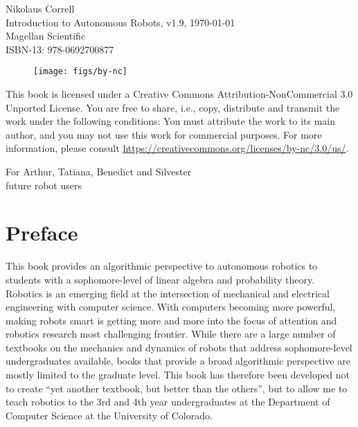 \documentclass[paper=6.14in:9.21in,pagesize=pdftex,11pt,twoside,openright]{scrbook}
\begin{document}

\thispagestyle{empty}
\begin{flushleft}
Nikolaus Correll\\
Introduction to Autonomous Robots, v1.9, \today\\
Magellan Scientific\\
ISBN-13: 978-0692700877
\end{flushleft}

\vfill

\begin{figure}[!h]
\texttt{[image: figs/by-nc]}
\end{figure}

This book is licensed under a Creative Commons Attribution-NonCommercial 3.0 Unported License. You are free to share, i.e., copy, distribute and transmit the work under the following conditions: You must attribute the work to its main author, and you may not use this work for commercial purposes. For more information, please consult \url{https://creativecommons.org/licenses/by-nc/3.0/us/}.


\cleardoublepage
\thispagestyle{empty}
\vspace*{\fill}
\begin{center}
For Arthur, Tatiana, Benedict and Silvester\\
future robot users
\end{center}
\vspace*{\fill}

\tableofcontents

\chapter*{Preface}
This book provides an algorithmic perspective to autonomous robotics to students with a sophomore-level of linear algebra and probability theory. Robotics is an emerging field at the intersection of mechanical and electrical engineering with computer science. With computers becoming more powerful, making robots smart is getting more and more into the focus of attention and robotics research most challenging frontier. While there are a large number of textbooks on the mechanics and dynamics of robots that address sophomore-level undergraduates available, books that provide a broad algorithmic perspective are mostly limited to the graduate level. This book has therefore been developed not to create ``yet another textbook, but better than the others'', but to allow me to teach robotics to the 3rd and 4th year undergraduates at the Department of Computer Science at the University of Colorado.
\end{document}
